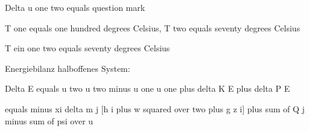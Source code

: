 Delta u one two equals question mark

T one equals one hundred degrees Celsius, T two equals seventy degrees Celsius

T ein one two equals seventy degrees Celsius

Energiebilanz halboffenes System:

Delta E equals u two u two minus u one u one plus delta K E plus delta P E

equals minus xi delta m j [h i plus w squared over two plus g z i] plus sum of Q j minus sum of psi over u